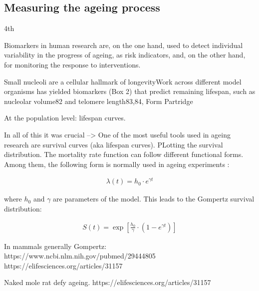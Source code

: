 \subsection{Measuring the ageing process}

4th

Biomarkers in human research are, on the one hand, used to detect individual variability in the progress of ageing, as risk indicators, and, on the other hand, for monitoring the response to interventions. 

Small nucleoli are a cellular hallmark of longevityWork across different model organisms has yielded biomarkers (Box 2) that predict remaining lifespan, such as nucleolar volume82 and telomere length83,84, Form Partridge

At the population level: lifespan curves. 

In all of this it was crucial --> One of the most useful tools used in ageing research are survival curves (aka lifespan curves). PLotting the survival distribution. The mortality rate function can follow different functional forms. Among them, the following form is normally used in ageing experiments \cite{Witten1986}:

\begin{align}
\lambda(t) = h_0 \cdot e^{\gamma t}
\end{align}

where $h_0$ and $\gamma$ are parameters of the model. This leads to the Gompertz survival distribution:

\begin{align}
S(t) = \exp \left[ \frac{h_0}{\gamma} \cdot (1-e^{\gamma t}) \right]
\end{align}



In mammals generally Gompertz:
https://www.ncbi.nlm.nih.gov/pubmed/29444805
https://elifesciences.org/articles/31157 

Naked mole rat defy ageing. https://elifesciences.org/articles/31157


